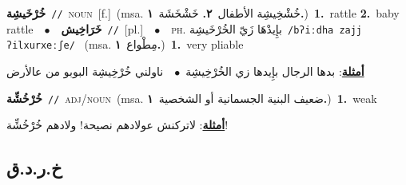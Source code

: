 \documentclass[10pt,a4paper,twoside]{article} %
\begin{document}
\begin{multicols}{2}
{\setlength\topsep{0pt}\textbf{\foreignlanguage{arabic}{خُرْخَيشِة}}\ {\color{gray}\texttt{//}\color{black}}\ \textsc{noun}\ [f.]\ \color{gray}(msa. \foreignlanguage{arabic}{خُشْخِيشِة الأطفال}~\foreignlanguage{arabic}{\textbf{٢.}}  \foreignlanguage{arabic}{خَشْخَشَة}~\foreignlanguage{arabic}{\textbf{١.}})\color{black}\ \textbf{1.}~rattle  \textbf{2.}~baby rattle\ \ $\bullet$\ \ \setlength\topsep{0pt}\textbf{\foreignlanguage{arabic}{خَرَاخِيش}}\ {\color{gray}\texttt{//}\color{black}}\ [pl.]\ \ $\bullet$\ \ \textsc{ph.} \color{gray} \foreignlanguage{arabic}{بإِيدْهَا زَيّ الخُرْخَيشِة}\color{black}\ {\color{gray}\texttt{/{\sffamily bʔiːdha zajj ʔilxurxeːʃe}/}\color{black}}\ \color{gray} (msa. \foreignlanguage{arabic}{مِطْواع}~\foreignlanguage{arabic}{\textbf{١.}})\color{black}\ \textbf{1.}~very pliable\  \begin{flushright}\color{gray}\foreignlanguage{arabic}{\textbf{\underline{\foreignlanguage{arabic}{أمثلة}}}: بدها الرجال بإِيدها زي الخُرْخِيشِة\ $\bullet$\ \  ناولني خُرْخِيشِة البوبو من عالأرض}\end{flushright}\color{black}} \vspace{2mm}

{\setlength\topsep{0pt}\textbf{\foreignlanguage{arabic}{خُرْخُشِّة}}\ {\color{gray}\texttt{//}\color{black}}\ \textsc{adj/noun}\ \color{gray}(msa. \foreignlanguage{arabic}{ضعيف البنية الجسمانية أو الشخصية}~\foreignlanguage{arabic}{\textbf{١.}})\color{black}\ \textbf{1.}~weak\  \begin{flushright}\color{gray}\foreignlanguage{arabic}{\textbf{\underline{\foreignlanguage{arabic}{أمثلة}}}: لاتركنش عولادهم نصيحة! ولادهم خُرْخُشِّة!}\end{flushright}\color{black}} \vspace{2mm}

\vspace{-3mm}
\subsection*{\color{blue}\foreignlanguage{arabic}{خ.ر.د.ق}\color{blue}{}} 


\end{multicols}
\end{document}
